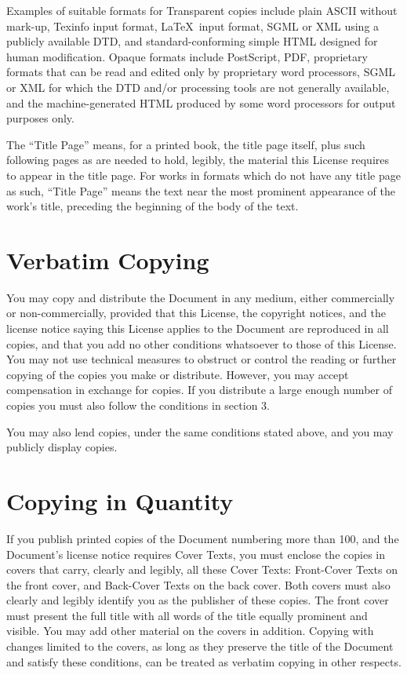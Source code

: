 \documentclass[12pt,twoside,openright,a4paper]{book}
\begin{document}
	Examples of suitable formats for Transparent copies include plain
	ASCII without mark-up, Texinfo input format, \LaTeX~input format, SGML
	or XML using a publicly available DTD, and standard-conforming simple
	HTML designed for human modification.  Opaque formats include
	PostScript, PDF, proprietary formats that can be read and edited only
	by proprietary word processors, SGML or XML for which the DTD and/or
	processing tools are not generally available, and the
	machine-generated HTML produced by some word processors for output
	purposes only.

	The ``Title Page'' means, for a printed book, the title page itself,
	plus such following pages as are needed to hold, legibly, the material
	this License requires to appear in the title page.  For works in
	formats which do not have any title page as such, ``Title Page'' means
	the text near the most prominent appearance of the work's title,
	preceding the beginning of the body of the text.


	\section{Verbatim Copying}

	You may copy and distribute the Document in any medium, either
	commercially or non-commercially, provided that this License, the
	copyright notices, and the license notice saying this License applies
	to the Document are reproduced in all copies, and that you add no other
	conditions whatsoever to those of this License.  You may not use
	technical measures to obstruct or control the reading or further
	copying of the copies you make or distribute.  However, you may accept
	compensation in exchange for copies.  If you distribute a large enough
	number of copies you must also follow the conditions in section 3.

	You may also lend copies, under the same conditions stated above, and
	you may publicly display copies.


	\section{Copying in Quantity}

	If you publish printed copies of the Document numbering more than 100,
	and the Document's license notice requires Cover Texts, you must enclose
	the copies in covers that carry, clearly and legibly, all these Cover
	Texts: Front-Cover Texts on the front cover, and Back-Cover Texts on
	the back cover.  Both covers must also clearly and legibly identify
	you as the publisher of these copies.  The front cover must present
	the full title with all words of the title equally prominent and
	visible.  You may add other material on the covers in addition.
	Copying with changes limited to the covers, as long as they preserve
	the title of the Document and satisfy these conditions, can be treated
	as verbatim copying in other respects.
\end{document}
